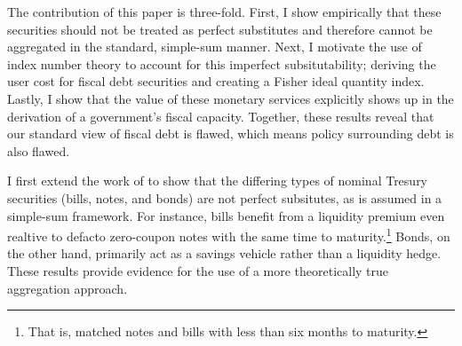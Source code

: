 \documentclass[11pt,a4paper,margin=1.5in]{article}
\begin{document}
The contribution of this paper is three-fold.
First, I show empirically that these securities should not be treated as perfect substitutes and therefore cannot be aggregated in the standard, simple-sum manner. 
Next, I motivate the use of index number theory to account for this imperfect subsitutability; deriving the user cost for fiscal debt securities and creating a Fisher ideal quantity index.
Lastly, I show that the value of these monetary services explicitly shows up in the derivation of a government's fiscal capacity.
Together, these results reveal that our standard view of fiscal debt is flawed, which means policy surrounding debt is also flawed.

I first extend the work of \citet{Amihud-Mendelson:1991} to show that the differing types of nominal Tresury securities (bills, notes, and bonds) are not perfect subsitutes, as is assumed in a simple-sum framework. 
For instance, bills benefit from a liquidity premium even realtive to defacto zero-coupon notes with the same time to maturity.\footnote{
	That is, matched notes and bills with less than six months to maturity.
}
Bonds, on the other hand, primarily act as a savings vehicle rather than a liquidity hedge. 
These results provide evidence for the use of a more theoretically true aggregation approach.
\end{document}
